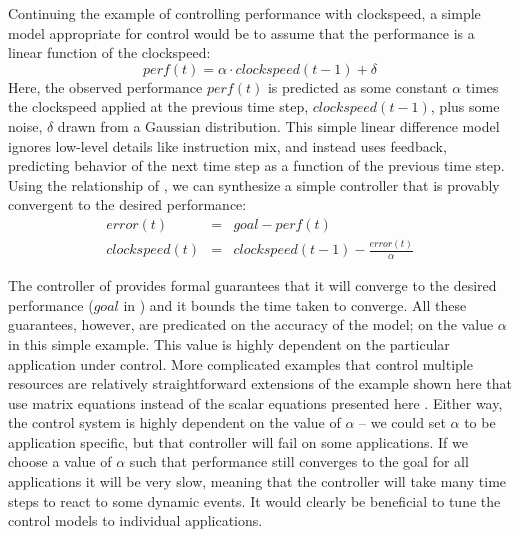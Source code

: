 Continuing the example of controlling performance with clockspeed, a
simple model appropriate for control would be to assume that the
performance is a linear function of the clockspeed:
\begin{equation}
  perf(t) = \alpha \cdot clockspeed(t-1) + \delta \label{eqn:clock}
\end{equation}
Here, the observed performance $perf(t)$ is predicted as some constant
$\alpha$ times the clockspeed applied at the previous time step,
$clockspeed(t-1)$, plus some noise, $\delta$ drawn from a Gaussian
distribution.  This simple linear difference model ignores low-level
details like instruction mix, and instead uses feedback, predicting
behavior of the next time step as a function of the previous time
step.  Using the relationship of , we can synthesize a
simple controller that is provably convergent to the desired
performance:
\begin{eqnarray}
  error(t) &=& goal - perf(t) \label{eqn:clock-error} \\
  clockspeed(t) &=& clockspeed(t-1) - \frac{error(t)}{\alpha}
  \label{eqn:clock-control}
\end{eqnarray}


The controller of  provides formal guarantees
that it will converge to the desired performance ($goal$ in
) and it bounds the time taken to converge.  All
these guarantees, however, are predicated on the accuracy of the
model; \ie on the value $\alpha$ in this simple example.  This value is
highly dependent on the particular application under control.  More
complicated examples that control multiple resources are relatively
straightforward extensions of the example shown here that use matrix
equations instead of the scalar equations presented here
\cite{METE,others}.  Either way, the control system is highly
dependent on the value of $\alpha$ -- we could set $\alpha$ to be
application specific, but that controller will fail on some
applications.  If we choose a value of $\alpha$ such that performance still
converges to the goal for all applications it will be very slow,
meaning that the controller will take many time steps to react to some
dynamic events.  It would clearly be beneficial to tune the control
models to individual applications.

